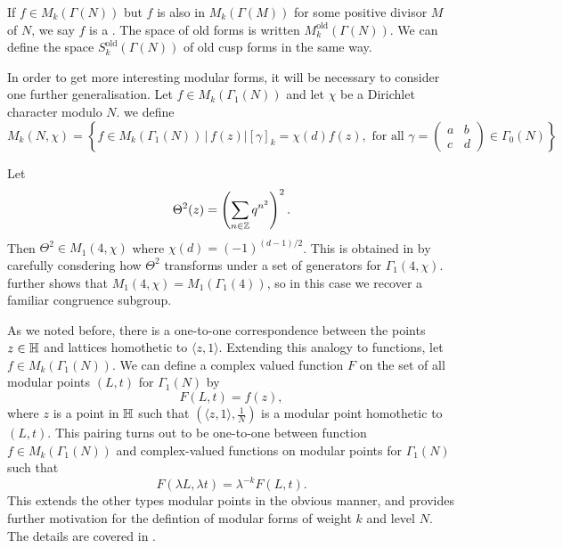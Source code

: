 \documentclass[12pt, a4paper]{report}
\begin{document}
\begin{defn}
  If $f \in M_k(\Gamma(N))$ but $f$ is also in $M_k(\Gamma(M))$ for some
  positive divisor $M$ of $N$, we say $f$ is a . The space of old forms is written
  $M_k^{\text{old}}(\Gamma(N)).$ We can define the space
  $S_k^{\text{old}}(\Gamma(N))$ of old cusp forms in the same way.  
\end{defn}

In order to get more interesting modular forms, it will be necessary to consider
one further generalisation. Let $f \in M_k(\Gamma_1(N))$ and let $\chi$ be a
Dirichlet character modulo $N$. we define
\[M_k(N, \chi) = \left\{ f \in M_k(\Gamma_1(N)) \, | \,
    f(z) | [\gamma]_k = \chi(d)f(z), \text{ for all } \gamma =
  \left(
    \begin{smallmatrix}
      a & b \\ c & d
    \end{smallmatrix}
\right) \in \Gamma_0(N) \right\}\]

\begin{example} \label{ex:theta}
  Let
  \[\Theta^2(z) = \left( \sum\limits_{n \in {\mathbb Z}} q^{n^2} \right)^2.\]
  Then $\Theta^2 \in M_1(4,\chi)$ where $\chi(d) = (-1)^{(d-1)/2}$.
  This is obtained in \cite[Proposition
  30]{koblitz} by carefully consdering how $\Theta^2$ transforms under a set of
  generators for $\Gamma_1(4, \chi)$. \cite[Proposition 28]{koblitz} further
  shows that $M_1(4, \chi) = M_1(\Gamma_1(4))$, so in this case we recover a
  familiar congruence subgroup.
\end{example}

As we noted before, there is a one-to-one correspondence
between the points $z\in \mathbb{H}$ and lattices homothetic to $\langle z, 1
\rangle$.
Extending this
analogy to functions, let $f \in M_k(\Gamma_1(N))$. We can define a complex
valued function
$F$ on the set of all modular points $(L,t)$ for $\Gamma_1(N)$ by
\[F(L,t) = f(z),\]
where $z$ is a point in $\mathbb{H}$ such that $(\langle z,1 \rangle, \frac{1}{N})$
is a modular point homothetic to $(L,t).$ This pairing turns out to be
one-to-one between function $f \in M_k(\Gamma_1(N))$ and complex-valued
functions on modular points for $\Gamma_1(N)$ such that
\[F(\lambda L, \lambda t) = \lambda^{-k} F(L, t).\]
This extends the other types modular points in the obvious manner, and
provides further motivation for the defintion of modular forms of weight
$k$ and level $N$. The details are covered in
\cite[Section III-5, Pages 153-155]{koblitz}.
\end{document}
